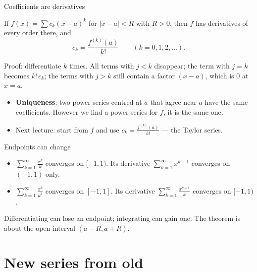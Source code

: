 \documentclass[10pt]{wosm-slides}
\begin{document}
\begin{frame}{Coefficients are derivatives}
  \begin{corollary}
    If $f(x) = \sum c_k (x - a)^k$ for $|x - a| < R$ with $R > 0$, then $f$ has derivatives of
    every order there, and
    \[ c_k = \frac{f^{(k)}(a)}{k!} \qquad (k = 0, 1, 2, \dots) . \]
  \end{corollary}
  \pause
  {\small Proof: differentiate $k$ times. All terms with $j < k$ disappear; the term with $j = k$
  becomes $k!\, c_k$; the terms with $j > k$ still contain a factor $(x - a)$, which is $0$ at
  $x = a$.\par}
  \pause
  \begin{itemize}
    \item \textbf{Uniqueness}: two power series centred at $a$ that agree near $a$ have the same
      coefficients. However we find a power series for $f$, it is the same one.
    \item Next lecture: start from $f$ and use $c_k = \frac{f^{(k)}(a)}{k!}$ --- the Taylor series.
  \end{itemize}
\end{frame}

\begin{frame}{Endpoints can change}
  \begin{example}
    \begin{itemize}
      \item $\sum_{k=1}^\infty \frac{x^k}{k}$ converges on $[-1, 1)$. Its derivative
        $\sum_{k=1}^\infty x^{k-1}$ converges on $(-1, 1)$ only.
      \item $\sum_{k=1}^\infty \frac{x^k}{k^2}$ converges on $[-1, 1]$. Its derivative
        $\sum_{k=1}^\infty \frac{x^{k-1}}{k}$ converges on $[-1, 1)$.
    \end{itemize}
  \end{example}
  Differentiating can lose an endpoint; integrating can gain one.
  The theorem is about the open interval $(a - R, a + R)$.
\end{frame}

\section{New series from old}
\end{document}
